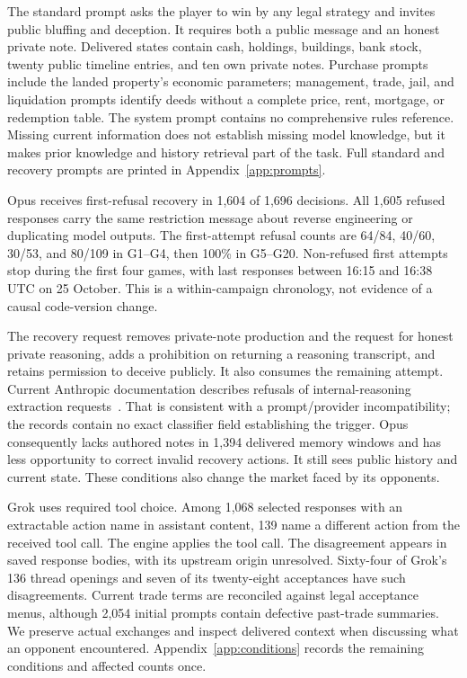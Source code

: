The standard prompt asks the player to win by any legal strategy and invites public bluffing and deception. It requires both a public message and an honest private note. Delivered states contain cash, holdings, buildings, bank stock, twenty public timeline entries, and ten own private notes. Purchase prompts include the landed property's economic parameters; management, trade, jail, and liquidation prompts identify deeds without a complete price, rent, mortgage, or redemption table. The system prompt contains no comprehensive rules reference. Missing current information does not establish missing model knowledge, but it makes prior knowledge and history retrieval part of the task. Full standard and recovery prompts are printed in Appendix~\ref{app:prompts}.

Opus receives first-refusal recovery in 1,604 of 1,696 decisions. All 1,605 refused responses carry the same restriction message about reverse engineering or duplicating model outputs. The first-attempt refusal counts are 64/84, 40/60, 30/53, and 80/109 in G1--G4, then 100\% in G5--G20. Non-refused first attempts stop during the first four games, with last responses between 16:15 and 16:38 UTC on 25 October. This is a within-campaign chronology, not evidence of a causal code-version change.

The recovery request removes private-note production and the request for honest private reasoning, adds a prohibition on returning a reasoning transcript, and retains permission to deceive publicly. It also consumes the remaining attempt. Current Anthropic documentation describes refusals of internal-reasoning extraction requests~\cite{anthropic2026opus}. That is consistent with a prompt/provider incompatibility; the records contain no exact classifier field establishing the trigger. Opus consequently lacks authored notes in 1,394 delivered memory windows and has less opportunity to correct invalid recovery actions. It still sees public history and current state. These conditions also change the market faced by its opponents.

Grok uses required tool choice. Among 1,068 selected responses with an extractable action name in assistant content, 139 name a different action from the received tool call. The engine applies the tool call. The disagreement appears in saved response bodies, with its upstream origin unresolved. Sixty-four of Grok's 136 thread openings and seven of its twenty-eight acceptances have such disagreements. Current trade terms are reconciled against legal acceptance menus, although 2,054 initial prompts contain defective past-trade summaries. We preserve actual exchanges and inspect delivered context when discussing what an opponent encountered. Appendix~\ref{app:conditions} records the remaining conditions and affected counts once.

